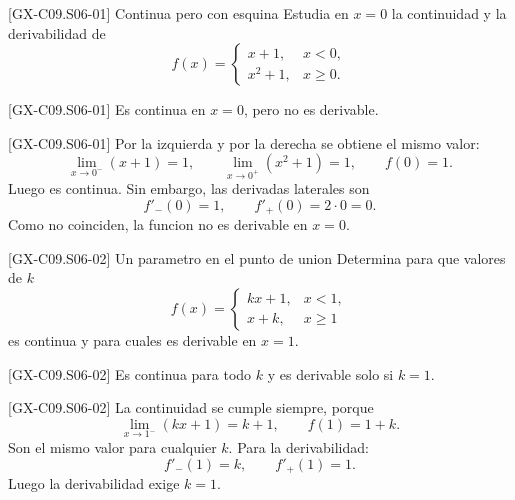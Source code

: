 \begin{guidedexercise}{[GX-C09.S06-01] Continua pero con esquina}
Estudia en \(x=0\) la continuidad y la derivabilidad de
\[
f(x)=
\begin{cases}
x+1,& x<0,\\
x^2+1,& x\geq 0.
\end{cases}
\]
\end{guidedexercise}

\begin{shortanswer}{[GX-C09.S06-01]}
Es continua en \(x=0\), pero no es derivable.
\end{shortanswer}

\begin{fullsolution}{[GX-C09.S06-01]}
Por la izquierda y por la derecha se obtiene el mismo valor:
\[
\lim_{x\to 0^-}(x+1)=1,\qquad \lim_{x\to 0^+}(x^2+1)=1,\qquad f(0)=1.
\]
Luego es continua. Sin embargo, las derivadas laterales son
\[
f'_-(0)=1,\qquad f'_+(0)=2\cdot 0=0.
\]
Como no coinciden, la funcion no es derivable en \(x=0\).
\end{fullsolution}

\begin{guidedexercise}{[GX-C09.S06-02] Un parametro en el punto de union}
Determina para que valores de \(k\)
\[
f(x)=
\begin{cases}
kx+1,& x<1,\\
x+k,& x\geq 1
\end{cases}
\]
es continua y para cuales es derivable en \(x=1\).
\end{guidedexercise}

\begin{shortanswer}{[GX-C09.S06-02]}
Es continua para todo \(k\) y es derivable solo si \(k=1\).
\end{shortanswer}

\begin{fullsolution}{[GX-C09.S06-02]}
La continuidad se cumple siempre, porque
\[
\lim_{x\to 1^-}(kx+1)=k+1,\qquad f(1)=1+k.
\]
Son el mismo valor para cualquier \(k\). Para la derivabilidad:
\[
f'_-(1)=k,\qquad f'_+(1)=1.
\]
Luego la derivabilidad exige \(k=1\).
\end{fullsolution}

